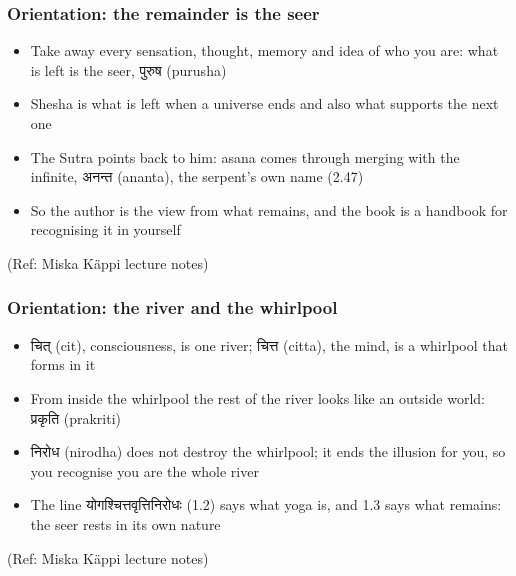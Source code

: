 \begin{frame}[fragile]\frametitle{Orientation: the remainder is the seer}

	\begin{itemize}
	\item Take away every sensation, thought, memory and idea of who you are: what is left is the seer, पुरुष (purusha)
	\item Shesha is what is left when a universe ends and also what supports the next one
	\item The Sutra points back to him: asana comes through merging with the infinite, अनन्त (ananta), the serpent's own name (2.47)
	\item So the author is the view from what remains, and the book is a handbook for recognising it in yourself
	\end{itemize}

\tiny{(Ref: Miska Käppi lecture notes)}

\end{frame}

\begin{frame}[fragile]\frametitle{Orientation: the river and the whirlpool}

	\begin{itemize}
	\item चित् (cit), consciousness, is one river; चित्त (citta), the mind, is a whirlpool that forms in it
	\item From inside the whirlpool the rest of the river looks like an outside world: प्रकृति (prakriti)
	\item निरोध (nirodha) does not destroy the whirlpool; it ends the illusion for you, so you recognise you are the whole river
	\item The line योगश्चित्तवृत्तिनिरोधः (1.2) says what yoga is, and 1.3 says what remains: the seer rests in its own nature
	\end{itemize}

\tiny{(Ref: Miska Käppi lecture notes)}

\end{frame}


